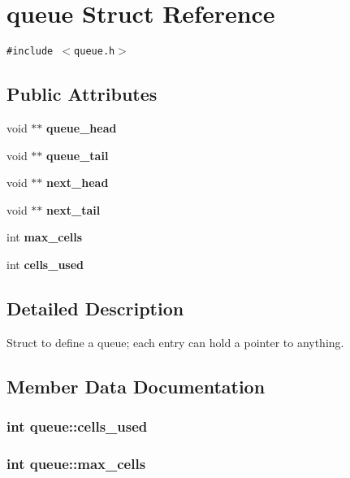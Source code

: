 \section{queue Struct Reference}
\label{structqueue}
{\tt \#include $<$queue.h$>$}

\subsection*{Public Attributes}
\begin{CompactItemize}
\item 
void $\ast$$\ast$ \bf{queue\_\-head}
\item 
void $\ast$$\ast$ \bf{queue\_\-tail}
\item 
void $\ast$$\ast$ \bf{next\_\-head}
\item 
void $\ast$$\ast$ \bf{next\_\-tail}
\item 
int \bf{max\_\-cells}
\item 
int \bf{cells\_\-used}
\end{CompactItemize}


\subsection{Detailed Description}
Struct to define a queue; each entry can hold a pointer to anything. 



\subsection{Member Data Documentation}
\subsubsection{\setlength{\rightskip}{0pt plus 5cm}int \bf{queue::cells\_\-used}}\label{structqueue_89ecd413e62ae3b9b968e782e81a60a4}


\subsubsection{\setlength{\rightskip}{0pt plus 5cm}int \bf{queue::max\_\-cells}}\label{structqueue_11da4ef0040f95b6cb18b12169fb3899}


